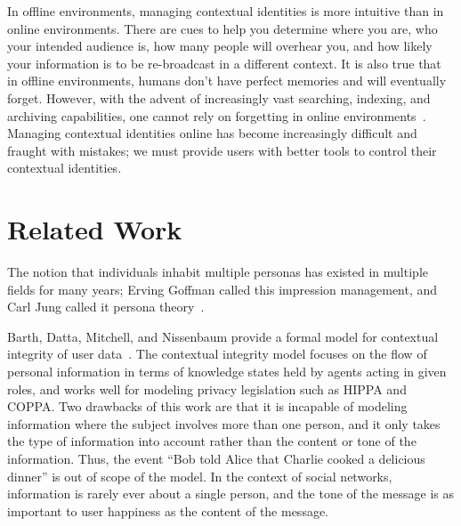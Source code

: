 \documentclass[10pt, conference, compsocconf]{IEEEtran}
\begin{document}
\begin{comment}
zuckerberg on "having multiple identities is dishonest"
http://books.google.ca/books?id=RRUkLhyGZVgC&pg=PA199&lpg=PA199&dq=%
\end{comment}

In offline environments, managing contextual identities is more intuitive than
in online environments. There are cues to help you determine where you are,
who your intended audience is, how many people will overhear you, and how
likely your information is to be re-broadcast in a different context. It is
also true that in offline environments, humans don't have perfect memories and
will eventually forget.  However, with the advent of increasingly vast
searching, indexing, and archiving capabilities, one cannot rely on forgetting
in online environments~\cite{delete}. Managing contextual identities
online has become increasingly difficult and fraught with mistakes; we must
provide users with better tools to control their contextual identities.

\section{Related Work}

The notion that individuals inhabit multiple personas has existed in multiple
fields for many years; Erving Goffman called this impression management, and
Carl Jung called it persona theory~\cite{goffman,jung}.

Barth, Datta, Mitchell, and Nissenbaum provide a formal model for contextual
integrity of user data~\cite{barth}. The contextual integrity model focuses on
the flow of personal information in terms of knowledge states held by agents
acting in given roles, and works well for modeling privacy legislation such as
HIPPA and COPPA. Two drawbacks of this work are that it is incapable of
modeling information where the subject involves more than one person, and it
only takes the type of information into account rather than the content or tone
of the information.  Thus, the event ``Bob told Alice that Charlie cooked a
delicious dinner'' is out of scope of the model.  In the context of social
networks, information is rarely ever about a single person, and the tone of the
message is as important to user happiness as the content of the message.
\end{document}
